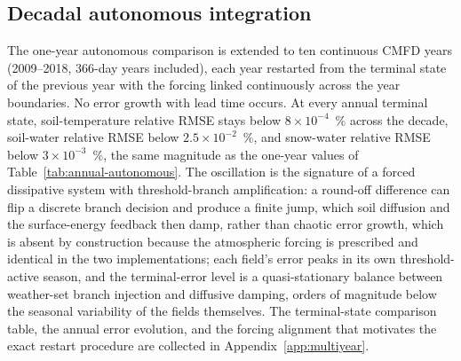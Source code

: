 \subsection{Decadal autonomous integration}
\label{sec:multiyear}

The one-year autonomous comparison is extended to ten continuous CMFD years
(2009--2018, 366-day years included), each year restarted from the terminal
state of the previous year with the forcing linked continuously across the
year boundaries. No error growth with lead time occurs. At every annual
terminal state, soil-temperature relative RMSE stays below
$8\times10^{-4}$~\% across the decade, soil-water relative RMSE below
$2.5\times10^{-2}$~\%, and snow-water relative RMSE below
$3\times10^{-3}$~\%, the same magnitude as the one-year values of
Table~\ref{tab:annual-autonomous}. The oscillation is the signature of a
forced dissipative system with threshold-branch amplification: a
round-off difference can flip a discrete branch decision and produce a finite
jump, which soil diffusion and the surface-energy feedback then damp,
rather than chaotic error growth, which is absent by construction because
the atmospheric forcing is prescribed and identical in the two
implementations; each field's error peaks in its own threshold-active
season, and the terminal-error level is a quasi-stationary balance between
weather-set branch injection and diffusive damping, orders of magnitude
below the seasonal variability of the fields themselves. The
terminal-state comparison table, the annual error evolution, and the forcing
alignment that motivates the exact restart procedure
are collected in Appendix~\ref{app:multiyear}.
